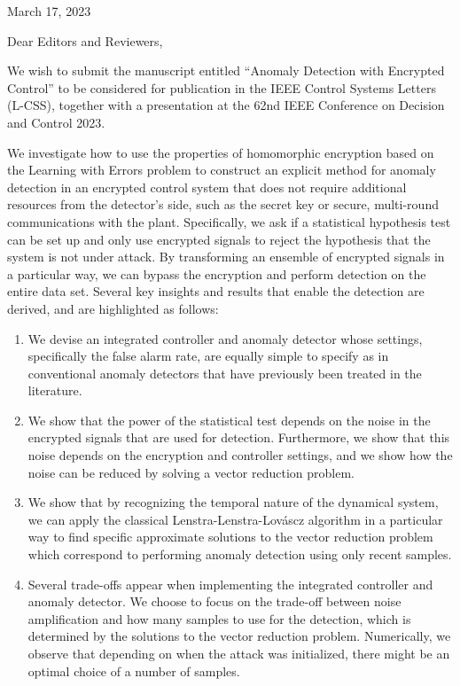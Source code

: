 \documentclass{letter}
\begin{document}
\hfill March 17, 2023

Dear Editors and Reviewers,

We wish to submit the manuscript entitled “Anomaly Detection with Encrypted Control” to be considered for publication in the IEEE Control Systems Letters (L-CSS), together with a presentation at the 62nd IEEE Conference on Decision and Control 2023. 

We investigate how to use the properties of homomorphic encryption based on the Learning with Errors problem to construct an explicit method for anomaly detection in an encrypted control system that does not require additional resources from the detector's side, such as the secret key or secure, multi-round communications with the plant. Specifically, we ask if a statistical hypothesis test can be set up and only use encrypted signals to reject the hypothesis that the system is not under attack. By transforming an ensemble of encrypted signals in a particular way, we can bypass the encryption and perform detection on the entire data set. Several key insights and results that enable the detection are derived, and are highlighted as follows:

\begin{enumerate}
   \item We devise an integrated controller and anomaly detector whose settings, specifically the false alarm rate, are equally simple to specify as in conventional anomaly detectors that have previously been treated in the literature.
   
	\item We show that the power of the statistical test depends on the noise in the encrypted signals that are used for detection. Furthermore, we show that this noise depends on the encryption and controller settings, and we show how the noise can be reduced by solving a vector reduction problem.

	\item We show that by recognizing the temporal nature of the dynamical system, we can apply the classical Lenstra-Lenstra-Lov\'ascz algorithm in a particular way to find specific approximate solutions to the vector reduction problem which correspond to performing anomaly detection using only recent samples.
	
	\item Several trade-offs appear when implementing the integrated controller and anomaly detector. We choose to focus on the trade-off between noise amplification and how many samples to use for the detection, which is determined by the solutions to the vector reduction problem. Numerically, we observe that depending on when the attack was initialized, there might be an optimal choice of a number of samples.
	
\end{enumerate}
\end{document}
